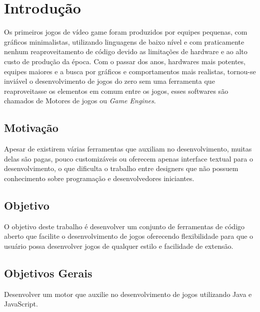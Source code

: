\documentclass[12pt,	openright, twoside,	a4paper, english, french, spanish, brazil]{abntex2}
\begin{document}
\chapter[Introdução]{Introdução}
Os primeiros jogos de vídeo game foram produzidos por equipes pequenas, com gráficos minimalistas, utilizando linguagens de baixo nível e com praticamente nenhum reaproveitamento de código devido as limitações de hardware e ao alto custo de produção da época. Com o passar dos anos, hardwares mais potentes, equipes maiores e a busca por gráficos e comportamentos mais realistas, tornou-se inviável o desenvolvimento de jogos do zero sem uma ferramenta que reaproveitasse os elementos em comum entre os jogos, esses softwares são chamados de Motores de jogos ou \textit{Game Engines}. 

%
%

\section{Motivação}
Apesar de existirem várias ferramentas que auxiliam no desenvolvimento, muitas delas são pagas, pouco customizáveis ou oferecem apenas interface textual para o desenvolvimento, o que dificulta o trabalho entre designers que não possuem conhecimento sobre programação e desenvolvedores iniciantes.

%
%

\section{Objetivo}
O objetivo deste trabalho é desenvolver um conjunto de ferramentas de código aberto que facilite o desenvolvimento de jogos oferecendo flexibilidade para que o usuário possa desenvolver jogos de qualquer estilo e facilidade de extensão.

%
%

\section{Objetivos Gerais}
Desenvolver um motor que auxilie no desenvolvimento de jogos utilizando Java e JavaScript.
\end{document}
